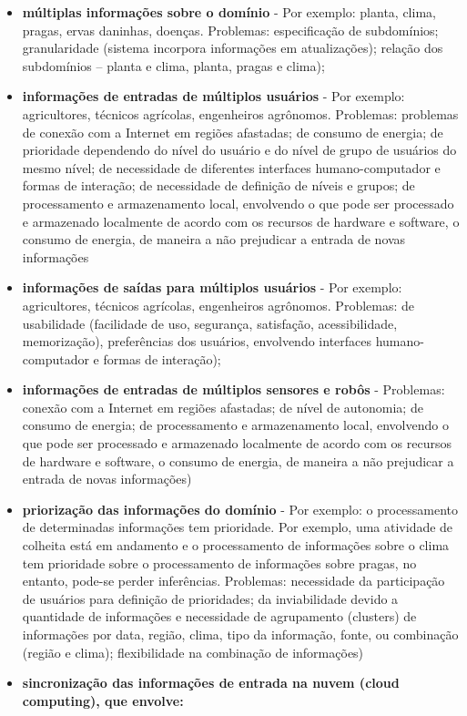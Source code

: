\documentclass[12pt]{article}
\begin{document}
\begin{itemize}
	\item \textbf{múltiplas informações sobre o domínio} - Por exemplo: planta, clima, pragas, ervas daninhas, doenças. Problemas: especificação de subdomínios; granularidade (sistema incorpora informações em atualizações); relação dos subdomínios – planta e clima, planta, pragas e clima);
	\item \textbf{informações de entradas de múltiplos usuários} - Por exemplo: agricultores, técnicos agrícolas, engenheiros agrônomos. Problemas: problemas de conexão com a Internet em regiões afastadas; de consumo de energia; de prioridade dependendo do nível do usuário e do nível de grupo de usuários do mesmo nível; de necessidade de diferentes interfaces humano-computador e formas de interação; de necessidade de definição de níveis e grupos; de processamento e armazenamento local, envolvendo o que pode ser processado e armazenado localmente de acordo com os recursos de hardware e software, o consumo de energia, de maneira a não prejudicar a entrada de novas informações
	\item \textbf{informações de saídas para múltiplos usuários} - Por exemplo: agricultores, técnicos agrícolas, engenheiros agrônomos. Problemas: de usabilidade (facilidade de uso, segurança, satisfação, acessibilidade, memorização), preferências dos usuários, envolvendo interfaces humano-computador e formas de interação);
	\item \textbf{informações de entradas de múltiplos sensores e robôs} - Problemas: conexão com a Internet em regiões afastadas; de nível de autonomia; de consumo de energia; de processamento e armazenamento local, envolvendo o que pode ser processado e armazenado localmente de acordo com os recursos de hardware e software, o consumo de energia, de maneira a não prejudicar a entrada de novas informações)
	\item \textbf{priorização das informações do domínio} - Por exemplo: o processamento de determinadas informações tem prioridade. Por exemplo, uma atividade de colheita está em andamento e o processamento de informações sobre o clima tem prioridade sobre o processamento de informações sobre pragas, no entanto, pode-se perder inferências. Problemas: necessidade da participação de usuários para definição de prioridades; da inviabilidade devido a quantidade de informações e necessidade de agrupamento (clusters) de informações por data, região, clima, tipo da informação, fonte, ou combinação (região e clima); flexibilidade na combinação de informações)
	\item \textbf{sincronização das informações de entrada na nuvem (cloud computing), que  envolve:}

\end{itemize}
\end{document}
